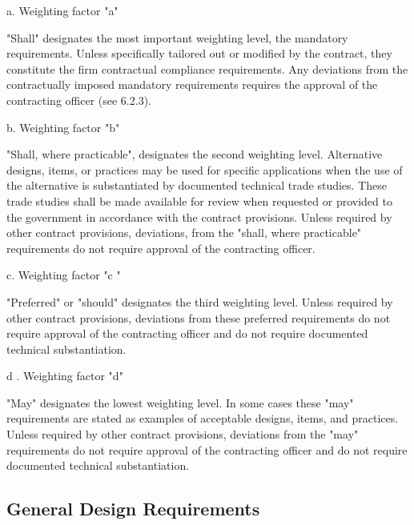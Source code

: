 \documentclass[12pt]{article}
\begin{document}
a. Weighting factor "a" 

"Shall" designates the most important weighting level, the mandatory requirements. 
Unless specifically tailored out or modified by the contract, they constitute the firm contractual compliance requirements. 
Any deviations from the contractually imposed mandatory requirements requires the approval of the contracting officer (see 6.2.3).

b. Weighting factor "b" 

"Shall, where practicable", designates the second weighting level. 
Alternative designs, items, or practices may be used for specific applications when the use of the alternative is substantiated by documented technical trade studies. 
These trade studies shall be made available for review when requested or provided to the government in accordance with the contract provisions. 
Unless required by other contract provisions, deviations, from the "shall, where practicable" requirements do not require approval of the contracting officer.

c. Weighting factor "c " 

"Preferred" or "should" designates the third weighting level. 
Unless required by other contract provisions, deviations from these preferred requirements do not require approval of the contracting officer and do not require documented technical substantiation.

d . Weighting factor "d" 

"May" designates the lowest weighting level. 
In some cases these "may" requirements are stated as examples of acceptable designs, items, and practices. 
Unless required by other contract provisions, deviations from the "may" requirements do not require approval of the contracting officer and do not require documented technical substantiation.

\subsection{General Design Requirements} %
\end{document}
